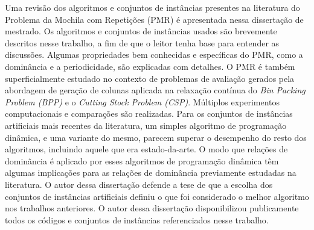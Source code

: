 Uma revisão dos algoritmos e conjuntos de instâncias presentes na literatura do Problema da Mochila com Repetições (PMR) é apresentada nessa dissertação de mestrado.
Os algoritmos e conjuntos de instâncias usados são brevemente descritos nesse trabalho, a fim de que o leitor tenha base para entender as discussões.
Algumas propriedades bem conhecidas e específicas do PMR, como a dominância e a periodicidade, são explicadas com detalhes.
O PMR é também superficialmente estudado no contexto de problemas de avaliação gerados pela abordagem de geração de colunas aplicada na relaxação contínua do \emph{Bin Packing Problem (BPP)} e o \emph{Cutting Stock Problem (CSP)}.
Múltiplos experimentos computacionais e comparações são realizadas.
Para os conjuntos de instâncias artificiais mais recentes da literatura, um simples algoritmo de programação dinâmica, e uma variante do mesmo, parecem superar o desempenho do resto dos algoritmos, incluindo aquele que era estado-da-arte.
O modo que relações de dominância é aplicado por esses algoritmos de programação dinâmica têm algumas implicações para as relações de dominância previamente estudadas na literatura.
O autor dessa dissertação defende a tese de que a escolha dos conjuntos de instâncias artificiais definiu o que foi considerado o melhor algoritmo nos trabalhos anteriores.
O autor dessa dissertação disponibilizou publicamente todos os códigos e conjuntos de instâncias referenciados nesse trabalho.
 
